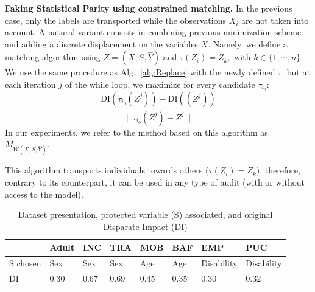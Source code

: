 \documentclass[runningheads, orivec]{llncs}
\begin{document}
\textbf{Faking Statistical Parity using constrained matching.} \label{sec:wass_matching} In the previous case, only the labels are transported while the observations $X_i$ are not taken into account. A natural variant consists in combining previous minimization scheme and adding a discrete displacement on the variables $X$. Namely, we define a matching algorithm using $ Z=(X,S,\widehat{Y})$ and $\tau(Z_i)= Z_k, \text{ with } k \in \{ 1,\cdots, n \}.$ We use the same procedure as Alg.~\ref{alg:Replace} with the newly defined $\tau$, but at each iteration $j$ of the while loop, we maximize for every candidate $\tau_{i_0}$: 
\begin{equation}
    \dfrac{\text{DI}(\tau_{i_0}(Z^j)) - \text{DI}((Z^j))}{\|\tau_{i_0}(Z^j) - Z^j\|}
\end{equation}
In our experiments, we refer to the method based on this algorithm as $M_{W(X,S,\widehat{Y})}$. 

\begin{remark}
  This algorithm transports individuals towards others ($\tau(Z_i)= Z_k$), therefore, contrary to its counterpart, it can be used in any type of audit (with or without access to the model). 
\end{remark} 

\begin{table}[t!]
 \centering
  \caption{Dataset presentation, protected variable (S) associated, and original Disparate Impact (DI)}

 \begin{tabular}{l lll lll l}
  \toprule
  & Adult & INC & TRA & MOB & BAF & EMP & PUC  \\
  \midrule
  S chosen & Sex & Sex & Sex & Age & Age & Disability & Disability \\
  DI & 0.30 & 0.67 & 0.69 & 0.45 & 0.35 & 0.30 & 0.32 \\
  \bottomrule
 \end{tabular}

  \label{tab:Dataset}
\end{table}
\end{document}
